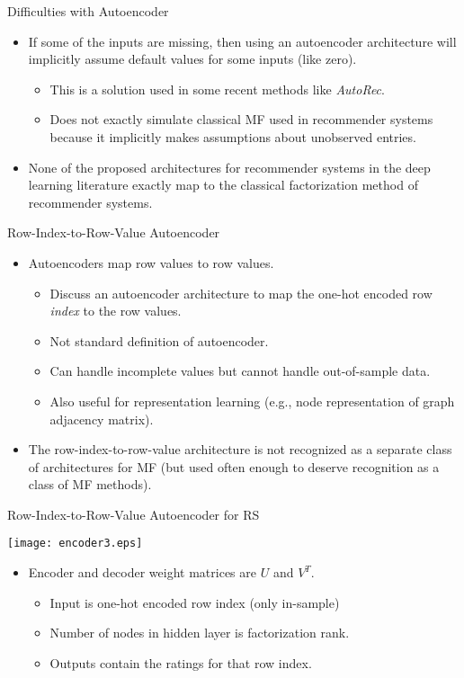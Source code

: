 \begin{frame}{Difficulties with Autoencoder}
\begin{itemize}
\item If some of the inputs are missing, then using an autoencoder
architecture will implicitly assume default values for some inputs
(like zero).
\begin{itemize}
\item This is a solution used in some recent methods like {\em AutoRec}.
\item Does not exactly simulate classical MF used in recommender systems because it
implicitly makes assumptions about unobserved entries.
\end{itemize}
\item  None of the proposed architectures for recommender systems in
the deep learning literature  exactly map to the classical
factorization method of recommender systems.
\end{itemize}
\end{frame}


\begin{frame}{Row-Index-to-Row-Value Autoencoder}
\begin{itemize}
\item Autoencoders map row values to row values.
\begin{itemize}
\item Discuss an autoencoder architecture to map the one-hot
encoded row {\em index} to the row values. \item Not standard
definition of autoencoder.
\item Can handle incomplete values but cannot handle out-of-sample
data.
\item Also useful for representation learning (e.g., node representation of graph adjacency matrix).
\end{itemize}
\item The row-index-to-row-value architecture is not recognized as a
separate class of architectures for MF  (but used often enough to
deserve recognition as a class of MF methods).
\end{itemize}
\end{frame}


\begin{frame}{Row-Index-to-Row-Value Autoencoder for RS}
\begin{center}
\texttt{[image: encoder3.eps]}
\end{center}
\begin{itemize}
\item Encoder and decoder weight matrices are $U$ and $V^T$.
\begin{itemize}
\item Input is one-hot encoded row index (only in-sample)
\item Number of nodes in hidden layer is factorization rank.
\item Outputs contain the ratings for that row index.
\end{itemize}
\end{itemize}
\end{frame}


